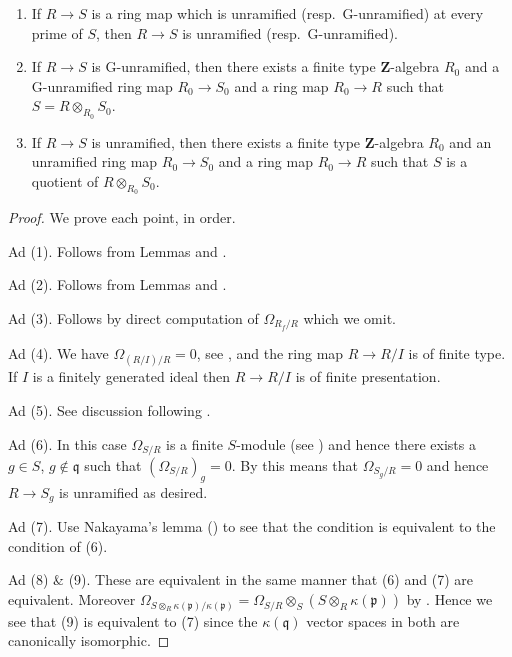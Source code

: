 \begin{lemma}
\begin{enumerate}
\item If $R \to S$ is a ring map which is unramified (resp.\ G-unramified)
at every prime of $S$, then $R \to S$ is unramified (resp.\ G-unramified).
\item If $R \to S$ is G-unramified, then there exists a finite type
$\mathbf{Z}$-algebra $R_0$ and a G-unramified ring map $R_0 \to S_0$
and a ring map $R_0 \to R$ such that $S = R \otimes_{R_0} S_0$.
\item If $R \to S$ is unramified, then there exists a finite type
$\mathbf{Z}$-algebra $R_0$ and an unramified ring map $R_0 \to S_0$
and a ring map $R_0 \to R$ such that $S$ is a quotient of
$R \otimes_{R_0} S_0$.
\end{enumerate}
\end{lemma}

\begin{proof}
We prove each point, in order.

\medskip\noindent
Ad (1). Follows from Lemmas 
and .

\medskip\noindent
Ad (2). Follows from Lemmas 
and .

\medskip\noindent
Ad (3). Follows by direct computation of $\Omega_{R_f/R}$ which we omit.

\medskip\noindent
Ad (4). We have $\Omega_{(R/I)/R} = 0$, see
,
and the ring map $R \to R/I$
is of finite type. If $I$ is a finitely generated ideal then $R \to R/I$
is of finite presentation.

\medskip\noindent
Ad (5). See discussion following .

\medskip\noindent
Ad (6). In this case $\Omega_{S/R}$ is a finite $S$-module (see
) and hence there
exists a $g \in S$, $g \not \in \mathfrak q$ such that
$(\Omega_{S/R})_g = 0$. By 
this means that $\Omega_{S_g/R} = 0$ and hence $R \to S_g$ is
unramified as desired.

\medskip\noindent
Ad (7). Use Nakayama's lemma () to see that
the condition is equivalent to the condition of (6).

\medskip\noindent
Ad (8) \& (9). These are equivalent in the same manner that (6) and (7)
are equivalent. Moreover
$\Omega_{S \otimes_R \kappa(\mathfrak p)/\kappa(\mathfrak p)} =
\Omega_{S/R} \otimes_S (S \otimes_R \kappa(\mathfrak p))$ by
.
Hence we see that (9) is equivalent to (7) since
the $\kappa(\mathfrak q)$ vector spaces in both are canonically
isomorphic.


\end{proof}
